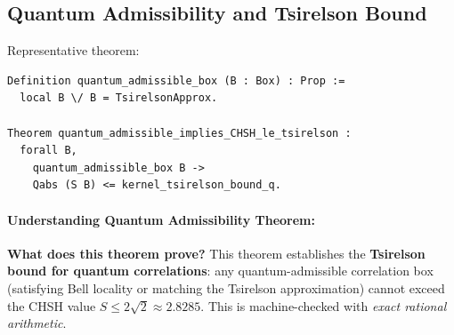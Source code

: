 \subsection{Quantum Admissibility and Tsirelson Bound}

Representative theorem:
\begin{lstlisting}
Definition quantum_admissible_box (B : Box) : Prop :=
  local B \/ B = TsirelsonApprox.

Theorem quantum_admissible_implies_CHSH_le_tsirelson :
  forall B,
    quantum_admissible_box B ->
    Qabs (S B) <= kernel_tsirelson_bound_q.
\end{lstlisting}

\paragraph{Understanding Quantum Admissibility Theorem:}

\textbf{What does this theorem prove?} This theorem establishes the \textbf{Tsirelson bound for quantum correlations}: any quantum-admissible correlation box (satisfying Bell locality or matching the Tsirelson approximation) cannot exceed the CHSH value $S \leq 2\sqrt{2} \approx 2.8285$. This is machine-checked with \textit{exact rational arithmetic}.

